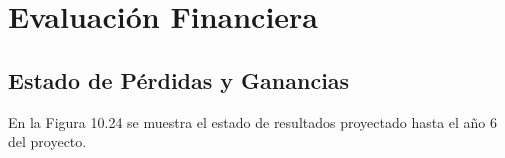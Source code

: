 \section{Evaluación Financiera}

\subsection{Estado de Pérdidas y Ganancias}

En la Figura 10.24 se muestra el estado de resultados proyectado hasta el año 6 del proyecto.
